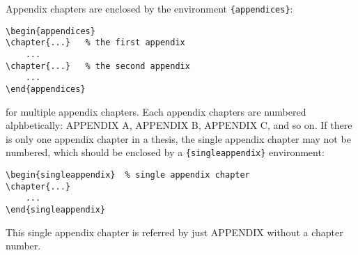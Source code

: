 Appendix chapters are enclosed by the environment \verb|{appendices}|:
\begin{verbatim}
\begin{appendices}
\chapter{...}	% the first appendix
    ...
\chapter{...}	% the second appendix
    ...
\end{appendices}
\end{verbatim}
for multiple appendix chapters.  Each appendix chapters are numbered
alphbetically: APPENDIX A, APPENDIX B, APPENDIX C, and so on.
If there is only one appendix chapter in a thesis, the single appendix chapter
may not be numbered, which should be enclosed by a \verb|{singleappendix}|
environment:
\begin{verbatim}
\begin{singleappendix}	% single appendix chapter
\chapter{...}
    ...
\end{singleappendix}
\end{verbatim}
This single appendix chapter is referred by just APPENDIX without a chapter
number.

